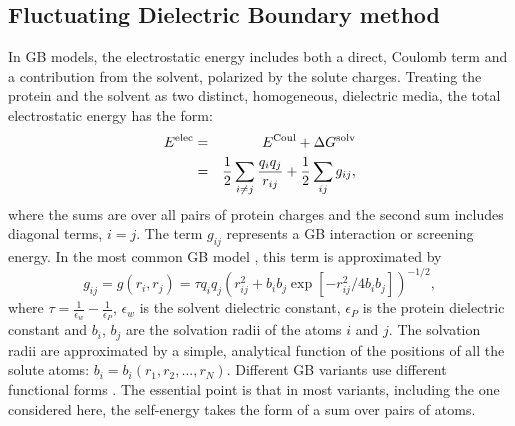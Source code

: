 \documentclass[a4paper,12pt]{article}
\begin{document}
\subsection{Fluctuating Dielectric Boundary method}
In GB models, the electrostatic energy includes both a direct, Coulomb term and a contribution from the solvent, polarized
by the solute charges. Treating the protein and the solvent as two distinct, homogeneous, dielectric media, the total
electrostatic energy has the form:
\begin{eqnarray}
E^{\rm elec} &=& E^{\rm Coul} + \Delta G^{\rm solv} \nonumber \\ 
             &=& \frac{1}{2} \sum_{i \neq j} \frac{q_i q_j}{r_{ij}}  + \frac{1}{2} \sum_{i j} g_{ij}, \label{eq:solv}
\end{eqnarray}
where the sums are over all pairs of protein charges and the second sum includes diagonal terms, $i=j$. The term $g_{ij}$
represents a GB interaction or screening energy. In the most common GB model \cite{Still90}, this term is approximated by
\begin{equation} \label{eq:atomic}
g_{ij} = g(r_i,r_j) = \tau q_i q_j \left( r_{ij}^2 + b_i b_j \exp[-r_{ij}^2/4 b_i b_j] \right)^{-1/2},
\end{equation}
where $\tau = \frac{1}{\epsilon_w} -\frac{1}{\epsilon_P}$, $\epsilon_w$ is the solvent dielectric constant, $\epsilon_P$
is the protein dielectric constant and $b_i$, $b_j$ are the solvation radii of the atoms $i$ and $j$. The solvation radii
are approximated by a simple, analytical function of the positions of all the solute atoms: $b_i = b_i(r_1,r_2,...,r_N)$.
Different GB variants use different functional forms \cite{Still90,Hawkins95,Schaefer96,Qiu97,Ghosh98,Lee02,Onufriev02}.
The essential point is that in most variants, including the one considered here, the self-energy takes the form of a sum
over pairs of atoms.
\end{document}
